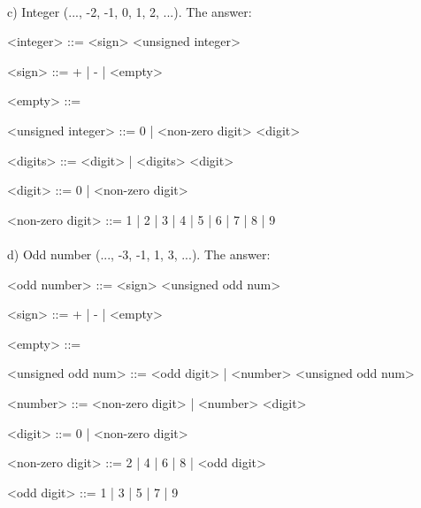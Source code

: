 \documentclass{article}
\begin{document}
	\paragraph{}
	\rmfamily
	
			c) Integer (..., -2, -1, 0, 1, 2, ...). The answer:
	\ttfamily
	\begin{grammar}
		
		<integer> ::= <sign> <unsigned integer>
		
		<sign> ::= + | - | <empty>
		
		<empty> ::= \
		
		<unsigned integer> ::= 0 | <non-zero digit> <digit>
				
		<digits> ::= <digit> | <digits> <digit>

		<digit> ::= 0 | <non-zero digit>
		
		<non-zero digit> ::= 1 | 2 | 3 | 4 | 5 | 6 | 7 | 8 | 9

		
	\end{grammar}




	\paragraph{}
	\rmfamily
	
			d) Odd number (..., -3, -1, 1, 3, ...). The answer:
	\ttfamily
	\begin{grammar}
	
		<odd number> ::= <sign> <unsigned odd num>
		
		<sign> ::= + | - | <empty>
		
		<empty> ::= \
		
		<unsigned odd num> ::= <odd digit> | <number> <unsigned odd num>
		
		<number> ::= <non-zero digit> | <number> <digit>
		
		<digit> ::= 0 | <non-zero digit>
		
		<non-zero digit> ::= 2 | 4 | 6 | 8 | <odd digit>
		
		<odd digit> ::= 1 | 3 | 5 | 7 | 9
		
	\end{grammar}
\end{document}
